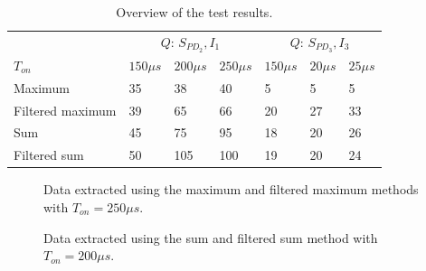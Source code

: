 \begin{table}[]
	\centering
\begin{tabular}{l|lll|lll|}
	& \multicolumn{3}{c|}{$Q$: $S_{PD_2}, I_1$} & \multicolumn{3}{c|}{$Q$: $S_{PD_3}, I_3$} \\
	$T_{on}$         & $150 \mu s$ & $200\mu s$ & $250\mu s$ & $150\mu s$  & $20\mu s$  & $25\mu s$  \\ \hline
	Maximum          & 35          & 38         & 40         & 5           & 5          & 5          \\
	Filtered maximum & 39          & 65         & 66         & 20          & 27         & 33         \\
	Sum              & 45          & 75         & 95         & 18          & 20         & 26         \\
	Filtered sum     & 50          & 105        & 100        & 19          & 20         & 24        
\end{tabular}
	\caption{Overview of the test results.\label{SNR_results}}
\end{table}


\begin{figure}
	\centering     %
	\caption{Data extracted using the maximum and filtered maximum methods with $T_{on} = 250\mu s$.\label{fig:SimpleFeatures}}
\end{figure}

\begin{figure}
	\centering     %
	\caption{Data extracted using the sum and filtered sum method with $T_{on} = 200\mu s$.\label{fig:complexFeatures}}
\end{figure}

